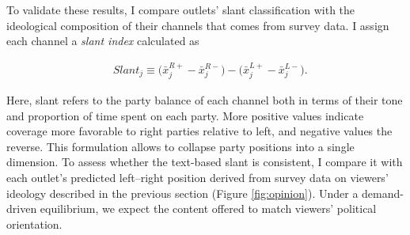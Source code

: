 \documentclass[12pt]{article}
\begin{document}
	
	
	
	
	
	To validate these results, I compare outlets' slant classification with the ideological composition of their channels that comes from survey data. 	I assign each channel a \textit{slant index} calculated as 
	
	
	
	\begin{equation}\label{eq:ideo_index}
		\begin{aligned}
			& Slant_j \equiv \bigl(\bar{x}_j^{R+}-\bar{x}_j^{R-}\bigr)-\bigl(\bar{x}_j^{L+}-\bar{x}_j^{L-}\bigr).
		\end{aligned}
	\end{equation} 


 
 Here, slant refers to the party balance of each channel both in terms of their tone and proportion of time spent on each party. More positive values indicate coverage more favorable to right parties relative to left,  and negative values the reverse. This formulation allows to collapse party positions into a single dimension.  To assess whether the text-based slant is consistent, I compare it with each outlet’s predicted left–right position derived from survey data on viewers’ ideology described in the previous section (Figure \ref{fig:opinion}). Under a demand-driven equilibrium, we expect the content offered to match viewers' political orientation. 
 
\end{document}
